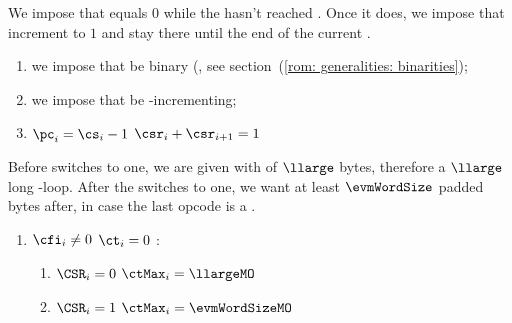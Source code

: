 We impose that \CSR{} equals $0$ while the \pc{} hasn't reached \CS{}.
Once it does, we impose that \csr{} increment to $1$ and stay there until the end of the current \cfi{}.
\begin{enumerate}
    \item we impose that \CSR{} be binary (\sanityCheck{}, see section~(\ref{rom: generalities: binarities});
    \item we impose that \CSR{} be \cfi-incrementing;
    \item \If $\pc_{i} = \cs_{i} - 1$ \Then $\csr_{i} + \csr_{i + 1}=1$
\end{enumerate}

Before \CSR{} switches to one,
we are given with \limb{}
of $\llarge$ bytes,
therefore a $\llarge$ long \ct{}-loop.
After the \CSR{} switches to one, we want at least $\evmWordSize$ padded bytes after, in case the last opcode is a . 
\begin{enumerate}[resume]
    \item \If $\cfi_{i} \neq 0$ \et $\ct_{i}=0$ \Then:
    \begin{enumerate}
        \item \If $\CSR_{i}=0$ \Then $\ctMax_{i} = \llargeMO$
        \item \If $\CSR_{i}=1$ \Then $\ctMax_{i} = \evmWordSizeMO$
    \end{enumerate}
\end{enumerate}
